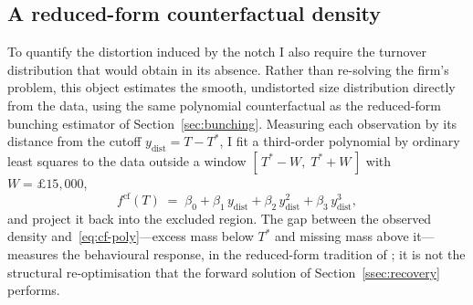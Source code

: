 \subsection{A reduced-form counterfactual density}
\label{ssec:cf-density}

To quantify the distortion induced by the notch I also require the turnover
distribution that would obtain in its absence. Rather than re-solving the firm's
problem, this object estimates the smooth, undistorted size distribution directly
from the data, using the same polynomial counterfactual as the reduced-form
bunching estimator of Section~\ref{sec:bunching}. Measuring each observation by
its distance from the cutoff $y_{\mathrm{dist}} = T - T^{*}$, I fit a third-order
polynomial by ordinary least squares to the data outside a window
$[\,T^{*}-W,\; T^{*}+W\,]$ with $W=\pounds15{,}000$,
\begin{equation}
  f^{\mathrm{cf}}(T) \;=\;
  \beta_0 + \beta_1\, y_{\mathrm{dist}} + \beta_2\, y_{\mathrm{dist}}^{2}
  + \beta_3\, y_{\mathrm{dist}}^{3},
  \label{eq:cf-poly}
\end{equation}
and project it back into the excluded region. The gap between the observed density
and~\eqref{eq:cf-poly}---excess mass below $T^{*}$ and missing mass above
it---measures the behavioural response, in the reduced-form tradition of
\citet{liuetal2021}; it is not the structural re-optimisation that the forward
solution of Section~\ref{ssec:recovery} performs.
